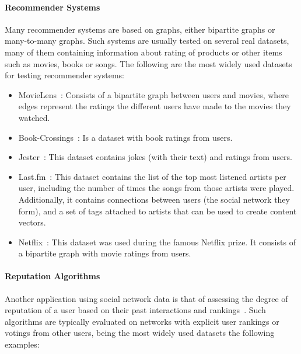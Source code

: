 \paragraph{Recommender Systems }

Many recommender systems are based on graphs, either bipartite graphs or
many-to-many graphs. Such systems are usually tested on several real datasets,
many of them containing information about rating of products or other items such
as movies, books or songs. The following are the most widely used datasets for
testing recommender systems:

\begin{itemize}
\item MovieLens~\cite{movielens}: Consists of a bipartite graph
  between users and movies, where edges represent the ratings the different
  users have made to the movies they watched. 
\item Book-Crossings~\cite{ziegler2005improving}: Is a dataset with book ratings
  from users. 
\item Jester~\cite{goldberg2001eigentaste}: This dataset contains jokes (with
  their text) and ratings from users. 
\item Last.fm~\cite{hetrec}: This dataset contains the list of the top
  most listened artists per user, including the number of times the songs from
  those artists were played. Additionally, it contains connections between users
  (the social network they form), and a set of tags attached to artists that can
  be used to create content vectors.
\item Netflix~\cite{zhou2008large}: This dataset was used during the famous
  Netflix prize. It consists of a bipartite graph with movie ratings from users.
\end{itemize}

\paragraph{Reputation Algorithms}

Another application using social network data is that of assessing the degree of
reputation of a user based on their past interactions and
rankings~\cite{kamvar2003eigentrust,katz2006social,kumar2016edge}. Such
algorithms are typically evaluated on networks with explicit user rankings or
votings from other users, being the most widely used datasets the following
examples:

